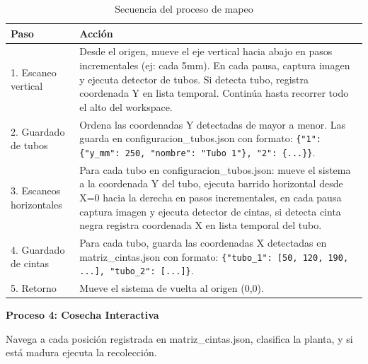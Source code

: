 \begin{table}[H]
\centering
\small
\begin{tabular}{|l|p{10cm}|}
\hline
\textbf{Paso} & \textbf{Acción} \\
\hline
1. Escaneo vertical & Desde el origen, mueve el eje vertical hacia abajo en pasos incrementales (ej: cada 5mm). En cada pausa, captura imagen y ejecuta detector de tubos. Si detecta tubo, registra coordenada Y en lista temporal. Continúa hasta recorrer todo el alto del workspace. \\
\hline
2. Guardado de tubos & Ordena las coordenadas Y detectadas de mayor a menor. Las guarda en configuracion\_tubos.json con formato: \texttt{\{"1": \{"y\_mm": 250, "nombre": "Tubo 1"\}, "2": \{...\}\}}. \\
\hline
3. Escaneos horizontales & Para cada tubo en configuracion\_tubos.json: mueve el sistema a la coordenada Y del tubo, ejecuta barrido horizontal desde X=0 hacia la derecha en pasos incrementales, en cada pausa captura imagen y ejecuta detector de cintas, si detecta cinta negra registra coordenada X en lista temporal del tubo. \\
\hline
4. Guardado de cintas & Para cada tubo, guarda las coordenadas X detectadas en matriz\_cintas.json con formato: \texttt{\{"tubo\_1": [50, 120, 190, ...], "tubo\_2": [...]\}}. \\
\hline
5. Retorno & Mueve el sistema de vuelta al origen (0,0). \\
\hline
\end{tabular}
\caption{Secuencia del proceso de mapeo}
\label{tab:proceso_mapeo}
\end{table}

\textbf{Proceso 4: Cosecha Interactiva}

Navega a cada posición registrada en matriz\_cintas.json, clasifica la planta, y si está madura ejecuta la recolección.

